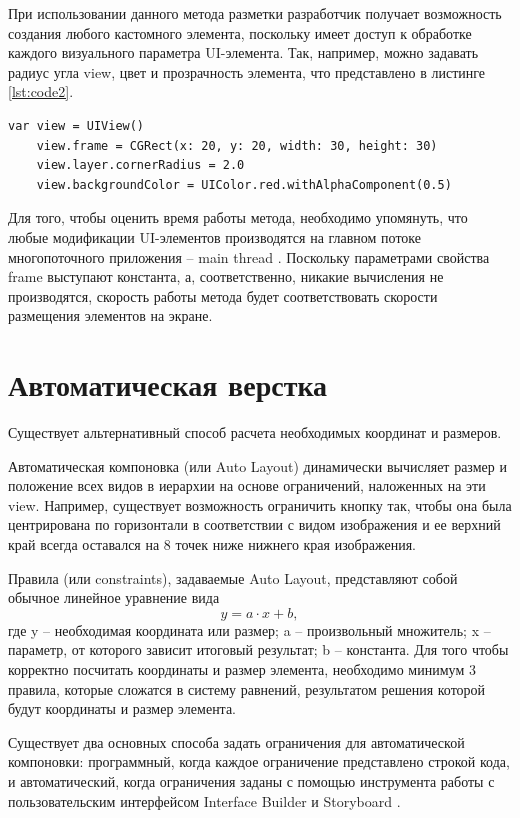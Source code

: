 При использовании данного метода разметки разработчик получает возможность создания любого кастомного элемента, поскольку имеет доступ к обработке каждого визуального параметра UI-элемента. 
Так, например, можно задавать радиус угла view, цвет и прозрачность элемента, что представлено в листинге \ref{lst:code2}.

\begin{lstlisting}[label=lst:code2, caption=Задание параметров view]
	var view = UIView()
	view.frame = CGRect(x: 20, y: 20, width: 30, height: 30)
	view.layer.cornerRadius = 2.0
	view.backgroundColor = UIColor.red.withAlphaComponent(0.5)
\end{lstlisting}

Для того, чтобы оценить время работы метода, необходимо упомянуть, что любые модификации UI-элементов производятся на главном потоке многопоточного приложения -- main thread \cite{mainthread}. Поскольку параметрами свойства frame выступают константа, а, соответственно, никакие вычисления не производятся, скорость работы метода будет соответствовать скорости размещения элементов на экране. 


\section{Автоматическая верстка}

Существует альтернативный способ расчета необходимых координат и размеров. 

Автоматическая компоновка (или Auto Layout) \cite{autolayout} динамически вычисляет размер и положение всех видов в иерархии на основе ограничений, наложенных на эти view. Например, существует возможность ограничить кнопку так, чтобы она была центрирована по горизонтали в соответствии с видом изображения и ее верхний край всегда оставался на 8 точек ниже нижнего края изображения. 

Правила (или constraints), задаваемые Auto Layout, представляют собой обычное линейное уравнение вида \begin{equation}
	y = a \cdot x + b,
\end{equation}
где y – необходимая координата или размер; a – произвольный множитель; x – параметр, от которого зависит итоговый результат; b – константа. Для того чтобы корректно посчитать координаты и размер элемента, необходимо минимум 3 правила, которые сложатся в систему равнений, результатом решения которой будут координаты и размер элемента.

Существует два основных способа задать ограничения для автоматической компоновки: программный, когда каждое ограничение представлено строкой кода, и автоматический, когда ограничения заданы с помощью инструмента работы с пользовательским интерфейсом Interface Builder и Storyboard \cite{storyboard}.

